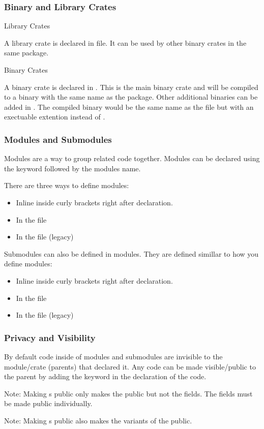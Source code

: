 \documentclass{beamer}
\begin{document}
\begin{frame}
  \frametitle{Binary and Library Crates}
  {\fontsize{15pt}{18pt}\selectfont Library Crates}

  A library crate is declared in  file. It can be used by other binary crates in the same package.

  {\fontsize{15pt}{18pt}\selectfont Binary Crates}

  A binary crate is declared in . This is the main binary crate and will be compiled to a binary with the same name as the package. Other additional binaries can be added in . The compiled binary would be the same name as the file but with an exectuable extention instead of .
\end{frame}

\begin{frame}
  \frametitle{Modules and Submodules}
  Modules are a way to group related code together. Modules can be declared using the  keyword followed by the modules name.

  There are three ways to define modules:
  \begin{itemize}
    \item Inline inside curly brackets right after declaration.
    \item In the file 
    \item In the file  (legacy)
  \end{itemize}

  Submodules can also be defined in modules. They are defined simillar to how you define modules:
  \begin{itemize}
    \item Inline inside curly brackets right after declaration.
    \item In the file 
    \item In the file  (legacy)
  \end{itemize}
\end{frame}

\begin{frame}
  \frametitle{Privacy and Visibility}
  By default code inside of modules and submodules are invisible to the module/crate (parents) that declared it. Any code can be made visible/public to the parent by adding the  keyword in the declaration of the code.

  

  \alert{Note}: Making s public only makes the  public but not the fields. The fields must be made public individually.

  \alert{Note}: Making s public also makes the variants of the  public.
\end{frame}
\end{document}
